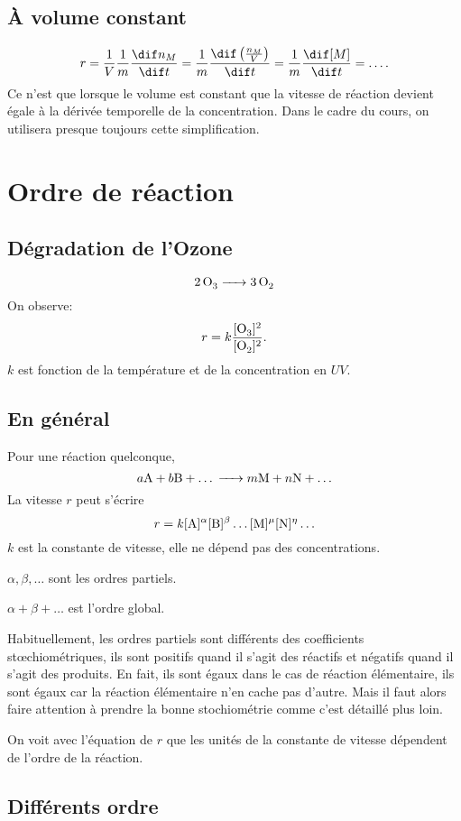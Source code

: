 \subsection{À volume constant}
\[ r = \frac 1V \frac 1m \frac {\dif n_M}{\dif t} =
  \frac 1m \frac {\dif \left(\frac {n_M}V\right)}{\dif t} =
  \frac 1m \frac {\dif [M]}{\dif t} = \ldots. \]
Ce n'est que lorsque le volume est constant que la vitesse de
réaction devient égale à la dérivée temporelle de la concentration.
Dans le cadre du cours, on utilisera presque toujours cette simplification.

\section{Ordre de réaction}
\subsection{Dégradation de l'Ozone}
\[ \ce{2O3} \ce{->} \ce{3O2} \]
On observe:
\[  r = k \frac{[\ce{O_3}]^2}{[\ce{O_2}]^2}. \]
$k$ est fonction de la température et de la concentration en $UV$.

\subsection{En général}
Pour une réaction quelconque,
\[ a\ce{A}+b\ce{B}+\ldots \ce{->} m\ce{M} + n\ce{N} + \ldots \]
La vitesse $r$ peut s'écrire
\[  r = k[\ce{A}]^{\alpha}[\ce{B}]^{\beta}
\ldots[\ce{M}]^{\mu}[\ce{N}]^{\eta}\ldots \]
$k$ est la constante de vitesse, elle ne dépend pas des concentrations.

$\alpha,\beta,\ldots$ sont les ordres partiels.

$\alpha+\beta+\ldots$ est l'ordre global.

Habituellement, les ordres partiels sont différents
des coefficients stœchiométriques,
ils sont positifs quand il s'agit des réactifs et
négatifs quand il s'agit des produits.
En fait, ils sont égaux dans le cas de réaction élémentaire,
ils sont égaux car la réaction élémentaire n'en cache pas d'autre.
Mais il faut alors faire attention à prendre la bonne stochiométrie
comme c'est détaillé plus loin.

On voit avec l'équation de $r$ que les unités de
la constante de vitesse dépendent de l'ordre de la réaction.

\subsection{Différents ordre}
